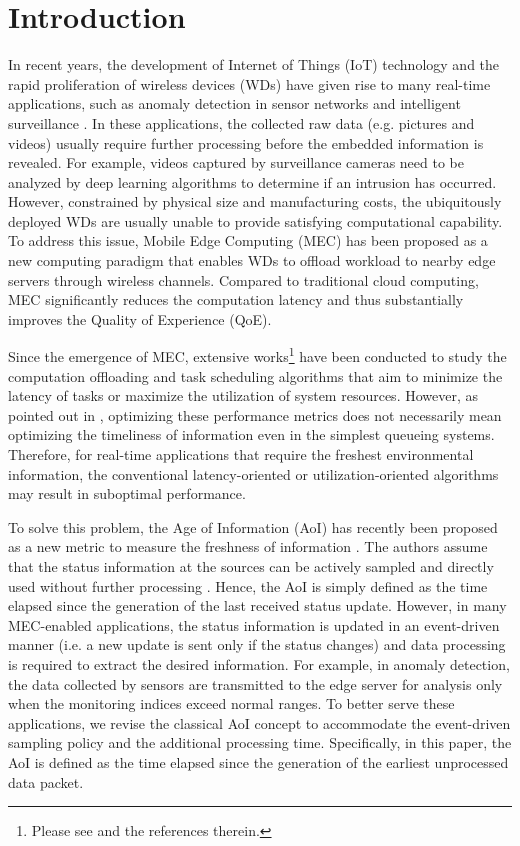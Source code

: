 \documentclass[lettersize, journal]{IEEEtran}
\begin{document}
\section{Introduction} \label{section:introduction}
In recent years, the development of Internet of Things (IoT) technology and the rapid proliferation of wireless devices (WDs)
have given rise to many real-time applications, such as anomaly detection in sensor networks \cite{erhan2021smart} and 
intelligent surveillance \cite{ko2018deep}.
In these applications, the collected raw data (e.g. pictures and videos) usually require further processing before the embedded information is revealed.
For example, videos captured by surveillance cameras need to be analyzed by deep learning algorithms
to determine if an intrusion has occurred.
However, constrained by physical size and manufacturing costs,
the ubiquitously deployed WDs are usually unable to provide satisfying computational capability.
To address this issue, Mobile Edge Computing (MEC) \cite{mao2017survey, mach2017mobile} has been proposed as a new computing paradigm
that enables WDs to offload workload to nearby edge servers through wireless channels.
Compared to traditional cloud computing,
MEC significantly reduces the computation latency and thus substantially improves the Quality of Experience (QoE).

Since the emergence of MEC, extensive works\footnote{Please see \cite{mao2017survey, mach2017mobile} and the references therein.} 
have been conducted to study the computation offloading and task scheduling algorithms
that aim to minimize the latency of tasks or maximize the utilization of system resources.
However, as pointed out in \cite{kaul2012real}, optimizing these performance metrics does not necessarily mean
optimizing the timeliness of information even in the simplest queueing systems.
Therefore, for real-time applications that require the freshest environmental information,
the conventional latency-oriented or utilization-oriented algorithms may result in suboptimal performance.

To solve this problem, the Age of Information (AoI) has recently been proposed as a new metric to measure the 
freshness of information \cite{kaul2011minimizing, kaul2012real, kosta2017age}.
The authors assume that the status information at the sources can be actively sampled
and directly used without further processing \cite{yates2015lazy}.
Hence, the AoI is simply defined as the time elapsed since the generation of the last received status update.
However, in many MEC-enabled applications, the status information is updated in an event-driven manner
(i.e. a new update is sent only if the status changes)
and data processing is required to extract the desired information.
For example, in anomaly detection,
the data collected by sensors are transmitted to the edge server for analysis only when the monitoring indices exceed normal ranges.
To better serve these applications, we revise the classical AoI concept
to accommodate the event-driven sampling policy and the additional processing time.
Specifically, in this paper, the AoI is defined as the time elapsed since the generation of the earliest unprocessed data packet.
\end{document}
